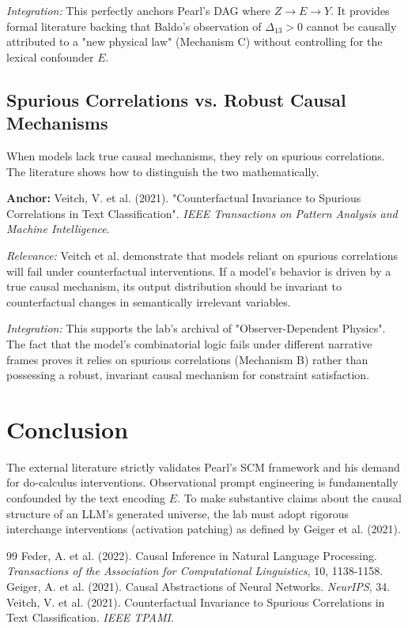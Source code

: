 \documentclass[12pt,a4paper]{article}
\begin{document}
\textit{Integration:} This perfectly anchors Pearl's DAG where $Z \rightarrow E \rightarrow Y$. It provides formal literature backing that Baldo's observation of $\Delta_{13} > 0$ cannot be causally attributed to a "new physical law" (Mechanism C) without controlling for the lexical confounder $E$.

\subsection{Spurious Correlations vs. Robust Causal Mechanisms}
When models lack true causal mechanisms, they rely on spurious correlations. The literature shows how to distinguish the two mathematically.

\textbf{Anchor:} Veitch, V. et al. (2021). "Counterfactual Invariance to Spurious Correlations in Text Classification". \textit{IEEE Transactions on Pattern Analysis and Machine Intelligence}.

\textit{Relevance:} Veitch et al. demonstrate that models reliant on spurious correlations will fail under counterfactual interventions. If a model's behavior is driven by a true causal mechanism, its output distribution should be invariant to counterfactual changes in semantically irrelevant variables.

\textit{Integration:} This supports the lab's archival of "Observer-Dependent Physics". The fact that the model's combinatorial logic fails under different narrative frames proves it relies on spurious correlations (Mechanism B) rather than possessing a robust, invariant causal mechanism for constraint satisfaction.

\section{Conclusion}

The external literature strictly validates Pearl's SCM framework and his demand for do-calculus interventions. Observational prompt engineering is fundamentally confounded by the text encoding $E$. To make substantive claims about the causal structure of an LLM's generated universe, the lab must adopt rigorous interchange interventions (activation patching) as defined by Geiger et al. (2021).

\begin{thebibliography}{99}
 Feder, A. et al. (2022). Causal Inference in Natural Language Processing. \emph{Transactions of the Association for Computational Linguistics}, 10, 1138-1158.
 Geiger, A. et al. (2021). Causal Abstractions of Neural Networks. \emph{NeurIPS}, 34.
 Veitch, V. et al. (2021). Counterfactual Invariance to Spurious Correlations in Text Classification. \emph{IEEE TPAMI}.
\end{thebibliography}
\end{document}
